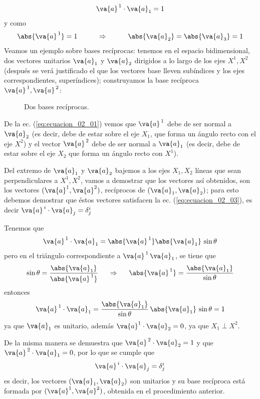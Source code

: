 \begin{align*}
\va{a}^{\, 1} \cdot \va{a}_{1} = 1
\end{align*} 
y como 
\begin{align*}
\abs{ \va{a}^{\, 1} } = 1 \hspace{1cm} \Rightarrow \hspace{1cm} \abs{\va{a}_{2}} = \abs{\va{a}_{3}} = 1
\end{align*}
Veamos un ejemplo sobre bases recíprocas: tenemos en el espacio bidimensional, dos vectores unitarios $\va{a}_{1}$ y $\va{a}_{2}$ dirigidos a lo largo de los ejes $X^{1}, X^{2}$ (después se verá justificado el que los vectores base lleven subíndices y los ejes correspondientes, superíndices); construyamos la base recíproca $\va{a}^{\, 1}, \va{a}^{\, 2}$:
\begin{figure}[H]
    \centering
    
    \caption{Dos bases recíprocas.}
    \label{fig:figura_02}
\end{figure}
De la ec. (\ref{eq:ecuacion_02_01}) vemos que $\va{a}^{\, 1}$ debe de ser normal a $\va{a}_{2}$ (es decir, debe de estar sobre el eje $X_{1}$, que forma un ángulo recto con el eje $X^{2}$) y el vector $\va{a}^{\, 2}$ debe de ser normal a $\va{a}_{1}$ (es decir, debe de estar sobre el eje $X_{2}$ que forma un ángulo recto con $X^{1}$).
\par
Del extremo de $\va{a}_{1}$ y $\va{a}_{2}$ bajemos a los ejes $X_{1}, X_{2}$ líneas que sean perpendiculares a $X^{1}, X^{2}$, vamos a demostrar que los vectores así obtenidos, son los vectores $(\va{a}^{1}, \va{a}^{2})$, recíprocos de $(\va{a}_{1}, \va{a}_{2})$; para esto debemos demostrar que éstos vectores satisfacen la ec. (\ref{eq:ecuacion_02_03}), es decir $\va{a}^{\, i} \cdot \va{a}_{j} = \delta_{j}^{i}$
\par
Tenemos que
\begin{align*}
\va{a}^{\, 1} \cdot \va{a}_{1} = \abs{\va{a}^{\, 1}} \abs{\va{a}_{1}} \, \sin \theta
\end{align*}
pero en el triángulo correspondiente a $\va{a}^{\, 1} \, \va{a}_{1}$, se tiene que
\begin{align*}
\sin \theta = \dfrac{\abs{\va{a}_{1}}}{\abs{\va{a}^{\, 1}}} \hspace{0.5 cm} \Rightarrow \hspace{0.5cm} \abs{\va{a}^{\, 1}}  = \dfrac{\abs{\va{a}_{1}}}{\sin \theta}
\end{align*}
entonces
\begin{align*}
\va{a}^{\, 1} \cdot \va{a}_{1} = \dfrac{\abs{\va{a}_{1}}}{\sin \theta} \, \abs{\va{a}_{1}} \, \sin \theta = 1
\end{align*}
ya que $\va{a}_{1}$ es unitario, además $\va{a}^{1} \cdot \va{a}_{2} = 0$, ya que $X_{1} \perp X^{2}$.
\par
De la misma manera se demuestra que $\va{a}^{\, 2} \cdot \va{a}_{2} = 1$ y que $\va{a}^{\, 2} \cdot \va{a}_{1} = 0$, por lo que se cumple que
\begin{align*}
\va{a}^{\, i} \cdot \va{a}_{j} = \delta_{j}^{i}
\end{align*}
es decir, los vectores $(\va{a}_{1}, \va{a}_{2})$
son unitarios y su base recíproca está formada por $(\va{a}^{1}, \va{a}^{2})$, obtenida en el procedimiento anterior.
